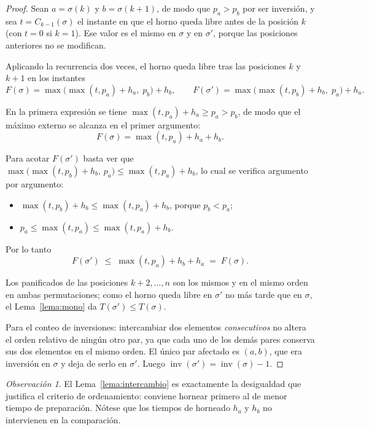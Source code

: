 \documentclass[11pt,a4paper]{article}
\theoremstyle{plain}
\theoremstyle{definition}
\theoremstyle{remark}
\newtheorem*{observacion}{Observación}
\newcommand{\inv}{\operatorname{inv}}
\begin{document}
\begin{proof}
Sean $a = \sigma(k)$ y $b = \sigma(k+1)$, de modo que $p_a > p_b$ por ser
inversión, y sea $t = C_{k-1}(\sigma)$ el instante en que el horno queda libre
antes de la posición $k$ (con $t = 0$ si $k = 1$). Ese valor es el mismo en
$\sigma$ y en $\sigma'$, porque las posiciones anteriores no se modifican.

Aplicando la recurrencia dos veces, el horno queda libre tras las posiciones $k$
y $k+1$ en los instantes
\[
  F(\sigma)  = \max\bigl( \max(t,p_a) + h_a,\; p_b \bigr) + h_b,
  \qquad
  F(\sigma') = \max\bigl( \max(t,p_b) + h_b,\; p_a \bigr) + h_a .
\]

En la primera expresión se tiene $\max(t,p_a) + h_a \geq p_a > p_b$, de modo que
el máximo externo se alcanza en el primer argumento:
\[
  F(\sigma) = \max(t,p_a) + h_a + h_b .
\]

Para acotar $F(\sigma')$ basta ver que
$\max\bigl( \max(t,p_b) + h_b,\, p_a \bigr) \leq \max(t,p_a) + h_b$, lo cual se
verifica argumento por argumento:
\begin{itemize}
  \item $\max(t,p_b) + h_b \leq \max(t,p_a) + h_b$, porque $p_b < p_a$;
  \item $p_a \leq \max(t,p_a) \leq \max(t,p_a) + h_b$.
\end{itemize}
Por lo tanto
\[
  F(\sigma') \;\leq\; \max(t,p_a) + h_b + h_a \;=\; F(\sigma).
\]

Los panificados de las posiciones $k+2,\dots,n$ son los mismos y en el mismo
orden en ambas permutaciones; como el horno queda libre en $\sigma'$ no más
tarde que en $\sigma$, el Lema~\ref{lema:mono} da $T(\sigma') \leq T(\sigma)$.

Para el conteo de inversiones: intercambiar dos elementos \emph{consecutivos} no
altera el orden relativo de ningún otro par, ya que cada uno de los demás pares
conserva sus dos elementos en el mismo orden. El único par afectado es $(a,b)$,
que era inversión en $\sigma$ y deja de serlo en $\sigma'$. Luego
$\inv(\sigma') = \inv(\sigma) - 1$.
\end{proof}

\begin{observacion}
El Lema~\ref{lema:intercambio} es exactamente la desigualdad que justifica el
criterio de ordenamiento: conviene hornear primero al de menor tiempo de
preparación. Nótese que los tiempos de horneado $h_a$ y $h_b$ no intervienen en
la comparación.
\end{observacion}
\end{document}
